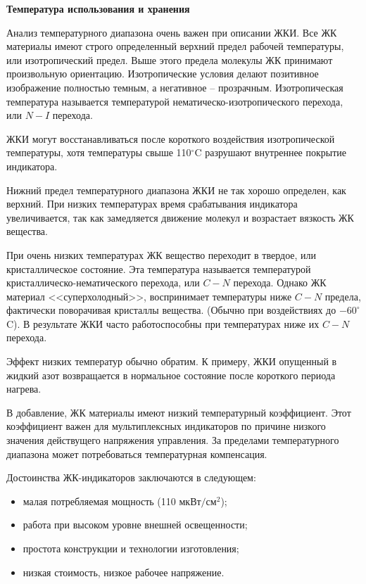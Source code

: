 \begin{flushleft}
\textbf{Температура использования и хранения}
\end{flushleft}

Анализ температурного диапазона очень важен при описании ЖКИ. Все ЖК материалы имеют строго определенный верхний предел рабочей температуры, или изотропический предел. Выше этого предела молекулы ЖК принимают произвольную ориентацию. Изотропические условия делают позитивное изображение полностью темным, а негативное -- прозрачным. Изотропическая температура называется температурой нематическо-изотропического перехода, или $ N-I $ перехода. 

ЖКИ могут восстанавливаться после короткого воздействия изотропической температуры, хотя температуры свыше 110$ ^\circ $C разрушают внутреннее покрытие индикатора. 

Нижний предел температурного диапазона ЖКИ не так хорошо определен, как верхний. При низких температурах время срабатывания индикатора увеличивается, так как замедляется движение молекул и возрастает вязкость ЖК вещества. 

При очень низких температурах ЖК вещество переходит в твердое, или кристаллическое состояние. Эта температура называется температурой кристаллическо-нематического перехода, или $ C-N $ перехода. Однако ЖК материал <<суперхолодный>>, воспринимает температуры ниже $ C-N $ предела, фактически поворачивая кристаллы вещества. (Обычно при воздействиях до $-60 ^\circ $C). В результате ЖКИ часто работоспособны при температурах ниже их $ C-N $ перехода.

Эффект низких температур обычно обратим. К примеру, ЖКИ опущенный в жидкий азот возвращается в нормальное состояние после короткого периода нагрева. 

В добавление, ЖК материалы имеют низкий температурный коэффициент. Этот коэффициент важен для мультиплексных индикаторов по причине низкого значения действущего напряжения управления. За пределами температурного диапазона может потребоваться температурная компенсация.

Достоинства ЖК-индикаторов заключаются в следующем:
\begin{itemize}
\item малая потребляемая мощность (110 $ \text{мкВт}/\text{см}^2 $);
\item работа при высоком уровне внешней освещенности;
\item простота конструкции и технологии изготовления;
\item низкая стоимость, низкое рабочее напряжение.
\end{itemize}

